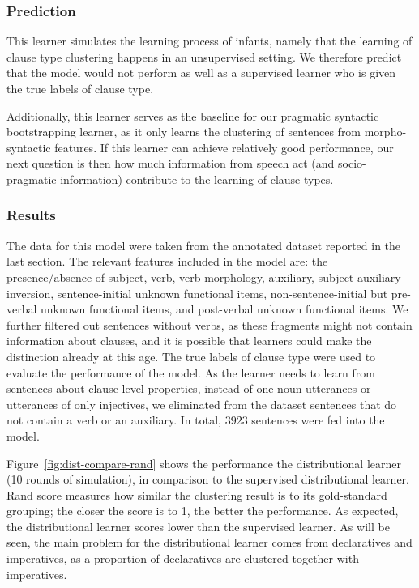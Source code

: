 \subsubsection{Prediction} 
\label{sec:engcl:model:baseline:predict}
This learner simulates the learning process of infants, namely that the learning of clause type clustering happens in an unsupervised setting. We therefore predict that the model would not perform as well as a supervised learner who is given the true labels of clause type. 

Additionally, this learner serves as the baseline for our pragmatic syntactic bootstrapping learner, as it only learns the clustering of sentences from morpho-syntactic features. If this learner can achieve relatively good performance, our next question is then how much information from speech act (and socio-pragmatic information) contribute to the learning of clause types.


\subsubsection{Results}
\label{sec:engcl:model:baseline:results}

The data for this model were taken from the annotated dataset reported in the last section. The relevant features included in the model are: the presence/absence of subject, verb, verb morphology, auxiliary, subject-auxiliary inversion, sentence-initial unknown functional items, non-sentence-initial but pre-verbal unknown functional items, and post-verbal unknown functional items. We further filtered out sentences without verbs, as these fragments might not contain information about clauses, and it is possible that learners could make the distinction already at this age. The true labels of clause type were used to evaluate the performance of the model. As the learner needs to learn from sentences about clause-level properties, instead of one-noun utterances or utterances of only injectives, we eliminated from the dataset sentences that do not contain a verb or an auxiliary. In total, $3923$  sentences were fed into the model.


Figure~\ref{fig:dist-compare-rand} shows the performance the distributional learner (10 rounds of simulation), in comparison to the supervised distributional learner. Rand score measures how similar the clustering result is to its gold-standard grouping; the closer the score is to 1, the better the performance. As expected, the distributional learner scores lower than the supervised learner. As will be seen, the main problem for the distributional learner comes from declaratives and imperatives, as a proportion of declaratives are clustered together with imperatives.

